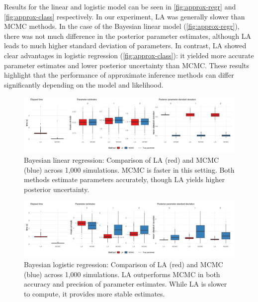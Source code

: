 Results for the linear and logistic model can be seen in \autoref{fig:approx-regr} and \autoref{fig:approx-class} respectively.
In our experiment, LA was generally slower than MCMC methods.
In the case of the Bayesian linear model (\autoref{fig:approx-regr}), there was not much difference in the posterior parameter estimates, although LA leads to much higher standard deviation of parameters.
In contrast, LA showed clear advantages in logistic regression (\autoref{fig:approx-class}): it yielded more accurate parameter estimates and lower posterior uncertainty than MCMC. These results highlight that the performance of approximate inference methods can differ significantly depending on the model and likelihood.

\begin{figure}[htbp]
    \centering
    \includegraphics[width=\linewidth]{../figures/approx_regr.png}
    \caption{
    Bayesian linear regression: Comparison of LA (red) and MCMC (blue) across 1,000 simulations. MCMC is faster in this setting. Both methods estimate parameters accurately, though LA yields higher posterior uncertainty. 
    }
    \label{fig:approx-regr}
\end{figure}

\begin{figure}[htbp]
    \centering
    \includegraphics[width=\linewidth]{../figures/approx_class.png}
    \caption{
    Bayesian logistic regression: Comparison of LA (red) and MCMC (blue) across 1,000 simulations. LA outperforms MCMC in both accuracy and precision of parameter estimates. While LA is slower to compute, it provides more stable estimates.
    }
    \label{fig:approx-class}
\end{figure}


